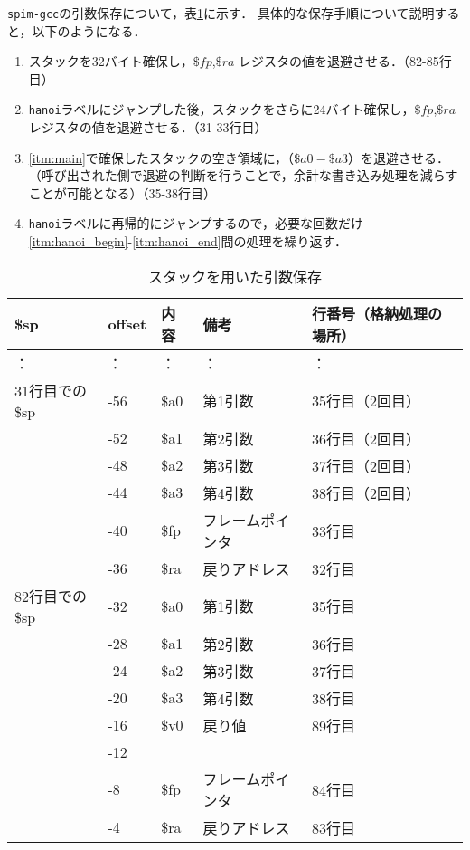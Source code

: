 \documentclass[a4j,11pt]{jarticle}
\begin{document}
{\tt spim-gcc}の引数保存について，表\ref{tbl:2-2}に示す．
具体的な保存手順について説明すると，以下のようになる．
\begin{enumerate}
      \item \label{itm:main}スタックを32バイト確保し，$\$fp$,$\$ra$ レジスタの値を退避させる．（82-85行目）
      \item \label{itm:hanoi_begin}{\tt hanoi}ラベルにジャンプした後，スタックをさらに24バイト確保し，$\$fp$,$\$ra$ レジスタの値を退避させる．（31-33行目）
      \item \label{itm:hanoi_end}\ref{itm:main}で確保したスタックの空き領域に，（$\$a0-\$a3$）を退避させる．（呼び出された側で退避の判断を行うことで，余計な書き込み処理を減らすことが可能となる）（35-38行目）
      \item {\tt hanoi}ラベルに再帰的にジャンプするので，必要な回数だけ\ref{itm:hanoi_begin}-\ref{itm:hanoi_end}間の処理を繰り返す．
\end{enumerate}

\begin{table}[t]
      \centering
      \caption{スタックを用いた引数保存}
      \label{tbl:2-2}
      \begin{tabular}{|l|l|l|l|l|}
      \hline
      \$sp       & offset & 内容   & 備考       & 行番号（格納処理の場所） \\ \hline
：          & ：      & ：    & ：        & ：            \\ \hline
31行目での\$sp & -56    & \$a0 & 第1引数     & 35行目（2回目）    \\ \hline
           & -52    & \$a1 & 第2引数     & 36行目（2回目）    \\ \hline
           & -48    & \$a2 & 第3引数     & 37行目（2回目）    \\ \hline
           & -44    & \$a3 & 第4引数     & 38行目（2回目）    \\ \hline
           & -40    & \$fp & フレームポインタ & 33行目         \\ \hline
           & -36    & \$ra & 戻りアドレス   & 32行目         \\ \hline
82行目での\$sp & -32    & \$a0 & 第1引数     & 35行目         \\ \hline
           & -28    & \$a1 & 第2引数     & 36行目         \\ \hline
           & -24    & \$a2 & 第3引数     & 37行目         \\ \hline
           & -20    & \$a3 & 第4引数     & 38行目         \\ \hline
           & -16    & \$v0 & 戻り値      & 89行目         \\ \hline
           & -12    &      &          &              \\ \hline
           & -8     & \$fp & フレームポインタ & 84行目         \\ \hline
           & -4     & \$ra & 戻りアドレス   & 83行目         \\ \hline
      \end{tabular}
      \end{table}
\end{document}
